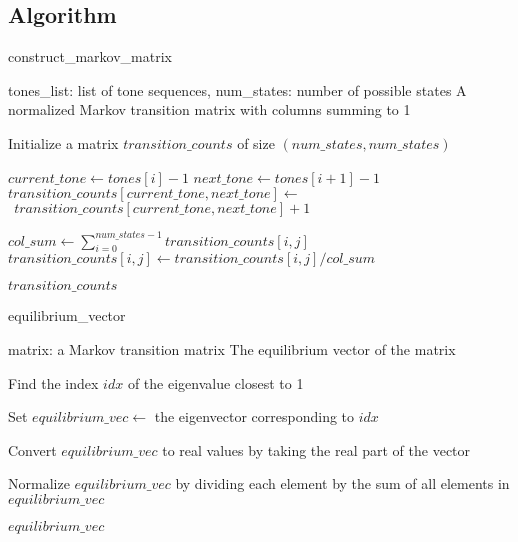 \documentclass[12pt]{article}
\begin{document}
\subsection{Algorithm}
\begin{algorithm}
    \caption{construct\_markov\_matrix}
    \begin{algorithmic}[1]
        \REQUIRE tones\_list: list of tone sequences, num\_states: number of possible states
        \ENSURE A normalized Markov transition matrix with columns summing to 1
    
        \STATE Initialize a matrix $transition\_counts$ of size $(num\_states, num\_states)$
    
                \STATE $current\_tone \gets tones[i] - 1$ 
                \STATE $next\_tone \gets tones[i+1] - 1$
                \STATE $transition\_counts[current\_tone, next\_tone] \gets$ 
                \STATE $ \ \ transition\_counts[current\_tone, next\_tone] + 1$
            \ENDFOR
        \ENDFOR
    
            \STATE $col\_sum \gets \sum_{i=0}^{num\_states - 1} transition\_counts[i, j]$
                    \STATE $transition\_counts[i, j] \gets transition\_counts[i, j] / col\_sum$
                \ENDFOR
            \ENDIF
        \ENDFOR
    
        \RETURN $transition\_counts$
    
\end{algorithmic}
\end{algorithm}

\begin{algorithm}
    \caption{equilibrium\_vector}
    \begin{algorithmic}[1]
        \REQUIRE matrix: a Markov transition matrix
        \ENSURE The equilibrium vector of the matrix
    
        \STATE Find the index $idx$ of the eigenvalue closest to 1
    
        \STATE Set $equilibrium\_vec \gets$ the eigenvector corresponding to $idx$
    
        \STATE Convert $equilibrium\_vec$ to real values by taking the real part of the vector
    
        \STATE Normalize $equilibrium\_vec$ by dividing each element by the sum of all elements in $equilibrium\_vec$
    
        \RETURN $equilibrium\_vec$
    
    \end{algorithmic}
\end{algorithm}
\end{document}

